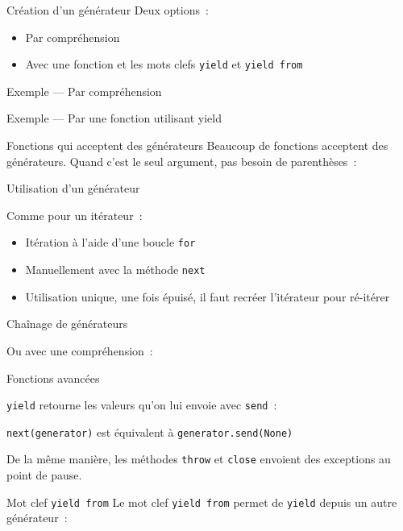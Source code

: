 \begin{frame}{Création d'un générateur}
  Deux options~:

  \begin{itemize}[<+->]
    \item Par compréhension
    \item Avec une fonction et les mots clefs \texttt{yield} et \texttt{yield from}
  \end{itemize}
\end{frame}

\begin{frame}{Exemple --- Par compréhension}
\end{frame}

\begin{frame}{Exemple --- Par une fonction utilisant yield}
\end{frame}

\begin{frame}{Fonctions qui acceptent des générateurs}
  Beaucoup de fonctions acceptent des générateurs. Quand c'est le seul argument, pas besoin de parenthèses~:

\end{frame}

\begin{frame}{Utilisation d'un générateur}

  Comme pour un itérateur~:

  \begin{itemize}[<+->]
    \item Itération à l'aide d'une boucle \texttt{for} 
    \item Manuellement avec la méthode \texttt{next} 
    \item \alert{Utilisation unique}, une fois épuisé, il faut recréer l'itérateur pour ré-itérer
  \end{itemize}
\end{frame}

\begin{frame}{Chaînage de générateurs}

  Ou avec une compréhension~:

\end{frame}

\begin{frame}{Fonctions avancées}

  \texttt{yield} retourne les valeurs qu'on lui envoie avec \texttt{send}~:


  \texttt{next(generator)} est équivalent à \texttt{generator.send(None)}

  De la même manière, les méthodes \texttt{throw} et \texttt{close} envoient des exceptions au point de pause.
\end{frame}

\begin{frame}{Mot clef \texttt{yield from}}
  Le mot clef \texttt{yield from} permet de \texttt{yield} depuis un autre générateur~:

\end{frame}
